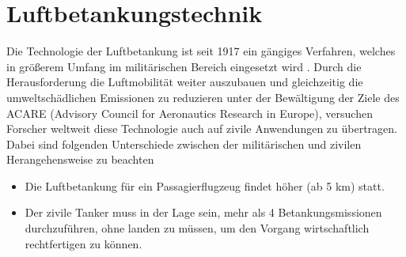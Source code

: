 \chapter{Luftbetankungstechnik}\label{cha:SdT}
Die Technologie der Luftbetankung ist seit 1917 ein gängiges Verfahren, welches in größerem Umfang im militärischen Bereich eingesetzt wird \cite{Methoden}. Durch die Herausforderung die Luftmobilität weiter auszubauen und gleichzeitig die umweltschädlichen Emissionen zu reduzieren unter der Bewältigung der Ziele des ACARE (Advisory Council for Aeronautics Research in Europe), versuchen Forscher weltweit diese Technologie auch auf zivile Anwendungen zu übertragen. Dabei sind folgenden Unterschiede zwischen der militärischen und zivilen Herangehensweise zu beachten \cite{CEAS2015}
\begin{itemize}
   
    \item Die Luftbetankung für ein Passagierflugzeug findet höher (ab 5 km) statt.
    \item Der zivile Tanker muss in der Lage sein, mehr als 4 Betankungsmissionen durchzuführen, ohne landen zu müssen, um den Vorgang wirtschaftlich rechtfertigen zu können.
\end{itemize}

